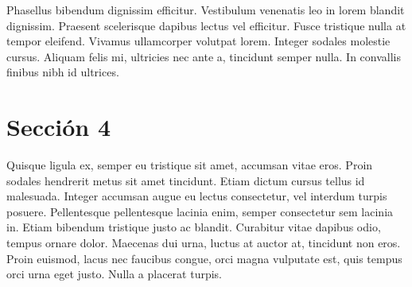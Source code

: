 	Phasellus bibendum dignissim efficitur. Vestibulum venenatis leo in lorem blandit dignissim. Praesent scelerisque dapibus lectus vel efficitur. Fusce tristique nulla at tempor eleifend. Vivamus ullamcorper volutpat lorem. Integer sodales molestie cursus. Aliquam felis mi, ultricies nec ante a, tincidunt semper nulla. In convallis finibus nibh id ultrices.

	\section{Sección 4}
	Quisque ligula ex, semper eu tristique sit amet, accumsan vitae eros. Proin sodales hendrerit metus sit amet tincidunt. Etiam dictum cursus tellus id malesuada. Integer accumsan augue eu lectus consectetur, vel interdum turpis posuere. Pellentesque pellentesque lacinia enim, semper consectetur sem lacinia in. Etiam bibendum tristique justo ac blandit. Curabitur vitae dapibus odio, tempus ornare dolor. Maecenas dui urna, luctus at auctor at, tincidunt non eros. Proin euismod, lacus nec faucibus congue, orci magna vulputate est, quis tempus orci urna eget justo. Nulla a placerat turpis.
